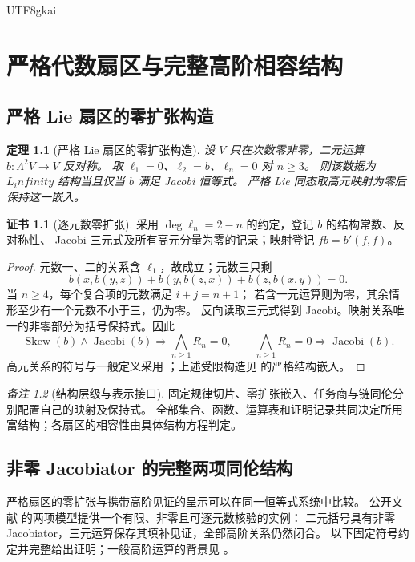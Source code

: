 \documentclass[12pt,a4paper,openany,notitlepage]{report}
\theoremstyle{plain}
\newtheorem{theorem}{定理}[chapter]
\theoremstyle{definition}
\newtheorem*{certificate}{证书}
\theoremstyle{remark}
\newtheorem{remark}[theorem]{备注}
\def\mathcal#1{#1}\def\mathsf#1{#1}\def\mathbb#1{#1}%
\def\infty{infinity}\def\Gamma{Gamma}\def\Phi{Phi}%
\begin{document}
\begin{CJK*}{UTF8}{gkai}
\chapter{严格代数扇区与完整高阶相容结构}
\label{exp:ch:higher}

\section{严格 Lie 扇区的零扩张构造}
\begin{theorem}[严格 Lie 扇区的零扩张构造]
\label{hgov:thm:strictlie}
设 $V$ 只在次数零非零，二元运算 $b:\Lambda^2V\to V$ 反对称。
取 $\ell_1=0$、$\ell_2=b$、$\ell_n=0$ 对 $n\ge3$。
则该数据为 $L_\infty$ 结构当且仅当 $b$ 满足 Jacobi 恒等式。
严格 Lie 同态取高元映射为零后保持这一嵌入。
\end{theorem}
\begin{certificate}[逐元数零扩张]
采用 $\deg\ell_n=2-n$ 的约定，登记 $b$ 的结构常数、反对称性、
Jacobi 三元式及所有高元分量为零的记录；映射登记 $fb=b'(f,f)$。
\end{certificate}
\begin{proof}
元数一、二的关系含 $\ell_1$，故成立；元数三只剩
\[
b(x,b(y,z))+b(y,b(z,x))+b(z,b(x,y))=0.
\]
当 $n\ge4$，每个复合项的元数满足 $i+j=n+1$；
若含一元运算则为零，其余情形至少有一个元数不小于三，仍为零。
反向读取三元式得到 Jacobi。映射关系唯一的非零部分为括号保持式。因此
\[
\operatorname{Skew}(b)\land\operatorname{Jacobi}(b)
\Rightarrow\bigwedge_{n\ge1}\mathcal R_n=0,
\qquad
\bigwedge_{n\ge1}\mathcal R_n=0\Rightarrow\operatorname{Jacobi}(b).
\]
高元关系的符号与一般定义采用 \cite{ExtLadaMarkl}；上述受限构造见
\cite{S38} 的严格结构嵌入。
\end{proof}

\begin{remark}[结构层级与表示接口]
固定规律切片、零扩张嵌入、任务商与链同伦分别配置自己的映射及保持式。
全部集合、函数、运算表和证明记录共同决定所用富结构；各扇区的相容性由具体结构方程判定。
\end{remark}

\section{非零 Jacobiator 的完整两项同伦结构}
\label{hgov:linfty:section}

严格扇区的零扩张与携带高阶见证的呈示可以在同一恒等式系统中比较。
公开文献 \cite{S38} 的两项模型提供一个有限、非零且可逐元数核验的实例：
二元括号具有非零 Jacobiator，三元运算保存其填补见证，全部高阶关系仍然闭合。
以下固定符号约定并完整给出证明；一般高阶运算的背景见 \cite{ExtLadaMarkl}。


\end{CJK*}
\end{document}

